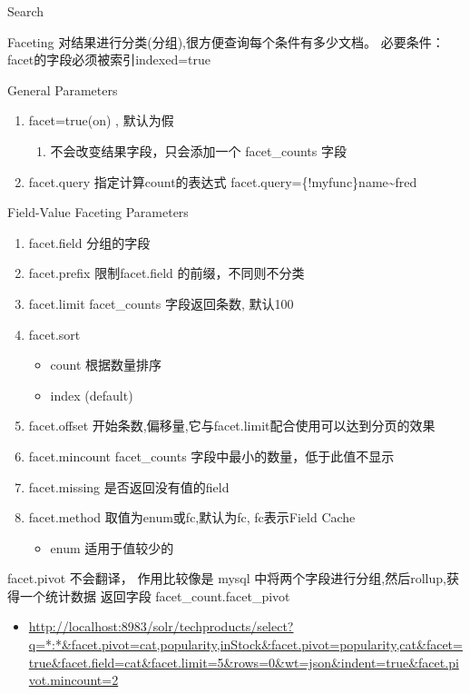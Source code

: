 \documentclass[presentation]{beamer}
\begin{document}
\begin{frame}[fragile,label={sec:org1ccf379}]{Search}
\begin{block}{Faceting}
对结果进行分类(分组),很方便查询每个条件有多少文档。
必要条件：facet的字段必须被索引indexed=true
\begin{block}{General Parameters}
\begin{enumerate}
\item facet=true(on) ,  默认为假
\begin{enumerate}
\item 不会改变结果字段，只会添加一个 facet\_counts 字段
\end{enumerate}
\item facet.query 指定计算count的表达式
facet.query=\{!myfunc\}name\textasciitilde{}fred
\end{enumerate}
\end{block}

\begin{block}{Field-Value Faceting Parameters}
\begin{enumerate}
\item facet.field  
分组的字段
\item facet.prefix 
限制facet.field 的前缀，不同则不分类
\item facet.limit  
facet\_counts 字段返回条数, 默认100
\item facet.sort
\begin{itemize}
\item count 根据数量排序
\item index (default)
\end{itemize}
\item facet.offset 
开始条数,偏移量,它与facet.limit配合使用可以达到分页的效果
\item facet.mincount 
facet\_counts 字段中最小的数量，低于此值不显示
\item facet.missing 
是否返回没有值的field
\item facet.method 
取值为enum或fc,默认为fc, fc表示Field Cache
\begin{itemize}
\item enum 适用于值较少的
\end{itemize}
\end{enumerate}
\end{block}


\begin{block}{facet.pivot}
不会翻译， 作用比较像是 mysql 中将两个字段进行分组,然后rollup,获得一个统计数据
返回字段 facet\_count.facet\_pivot
\begin{itemize}
\item \url{http://localhost:8983/solr/techproducts/select?q=*:*\&facet.pivot=cat,popularity,inStock\&facet.pivot=popularity,cat\&facet=true\&facet.field=cat\&facet.limit=5\&rows=0\&wt=json\&indent=true\&facet.pivot.mincount=2}
\end{itemize}
\end{block}
\end{block}




\end{frame}
\end{document}
